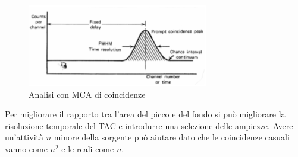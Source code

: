 \begin{figure}[htbp]
\begin{center}
	\includegraphics[scale=1]{./Immagini/SpettroCoincidenze.png}
\caption{Analisi con MCA di coincidenze}
\label{fig:spettroCoincidenze}
\end{center}
\end{figure}
Per migliorare il rapporto tra l'area del picco e del fondo si pu\`o migliorare la risoluzione temporale del TAC e introdurre una selezione delle ampiezze.
Avere un'attivit\`a $n$ minore della sorgente pu\`o aiutare dato che le coincidenze casuali vanno come $n^2$ e le reali come $n$.
